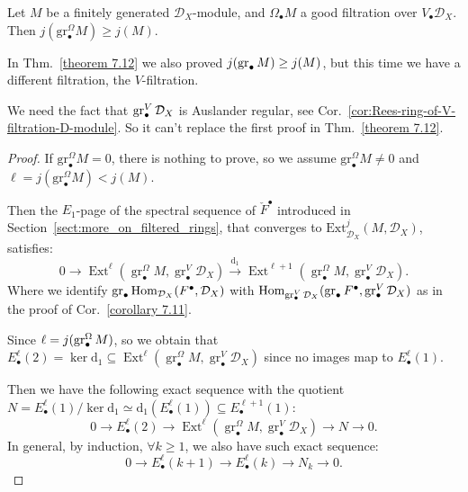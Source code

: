\begin{theorem}\label{Theorem 8.6}
    Let $M$ be a finitely generated $\mathcal{D}_{X}$-module, and $\Omega_{\bullet}M$ a good filtration over $V_{\bullet}\mathcal{D}_{X}$. Then $j(\mathrm{gr}_{\bullet}^\Omega M)\ge j(M)$.
\end{theorem}
\begin{remark}
    In Thm.~\ref{theorem 7.12} we also proved $j(\operatorname{gr}_\bullet M)\ge j(M)$, but this time we have a different filtration, the $V$-filtration.

    We need the fact that $\operatorname{gr}_\bullet^{V}\mathcal{D}_X$ is Auslander regular, see Cor.~\ref{cor:Rees-ring-of-V-filtration-D-module}. So it can't replace the first proof in Thm.~\ref{theorem 7.12}.
\end{remark}
\begin{proof}
    If $\mathrm{gr}^\Omega_{\bullet}M=0$, there is nothing to prove, so we assume $\mathrm{gr}^\Omega_{\bullet}M\neq 0$ and $\ell=j(\mathrm{gr}_{\bullet}^{\Omega}M)<j(M)$.

    Then the $E_1$-page of the spectral sequence of $\check{F}^\bullet$
    introduced in Section~\ref{sect:more_on_filtered_rings},
    that converges to $\mathrm{Ext}_{\mathcal{D}_{X}}^{j}(M,\mathcal{D}_{X})$,
    satisfies:
    \[
        0 \rightarrow \operatorname{Ext}^{\ell}(\operatorname{gr}_{\bullet}^{\Omega} M, \operatorname{gr}^{V}_{\bullet}\mathcal{D}_X)
        \xrightarrow{\mathrm{d}_1}
        \operatorname{Ext}^{\ell+1}(\operatorname{gr}_{\bullet}^{\Omega} M, \operatorname{gr}^{V}_{\bullet}\mathcal{D}_X).
    \]
    Where we identify $\operatorname{gr}_\bullet \operatorname{Hom}_{\mathcal{D}_X}(F^\bullet, \mathcal{D}_X)$ with $\operatorname{Hom}_{\operatorname{gr}_\bullet^{V} \mathcal{D}_X}(\operatorname{gr}_\bullet F^\bullet, \operatorname{gr}_\bullet^{V} \mathcal{D}_X)$
    as in the proof of Cor.~\ref{corollary 7.11}.

    Since $\ell = j(\operatorname{gr}_\bullet^\Omega M)$, so we obtain that $E^{\ell}_{\bullet}(2)=\ker \mathrm{d}_1\subseteq\operatorname{Ext}^{\ell}(\operatorname{gr}_{\bullet}^{\Omega} M, \operatorname{gr}^{V}_{\bullet}\mathcal{D}_X)$ since no images map to $E^{\ell}_{\bullet}(1)$.

    Then we have the following exact sequence with the quotient $N=E^{\ell}_{\bullet}(1) /\ker \mathrm{d}_{1}\simeq \mathrm{d}_{1}(E_{\bullet}^{\ell}(1))\subseteq E^{\ell+1}_{\bullet}(1)$:
    \[
        0 \rightarrow E_{\bullet}^{\ell}(2) \rightarrow \operatorname{Ext}^{\ell}(\operatorname{gr}_{\bullet}^{\Omega} M, \operatorname{gr}^{V}_{\bullet}\mathcal{D}_X)
        \rightarrow N \rightarrow 0.
    \]
    In general, by induction, $\forall k\ge 1$, we also have such exact sequence:
    \[
        0 \rightarrow E_{\bullet}^{\ell}(k+1) \rightarrow E_{\bullet}^{\ell}(k) \rightarrow N_k \rightarrow 0.
    \]


\end{proof}
